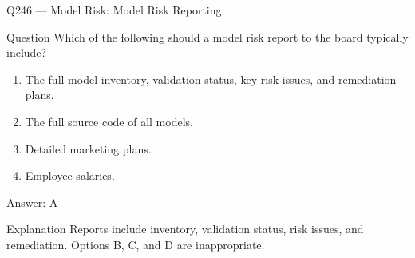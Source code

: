 \documentclass[aspectratio=169,8pt]{beamer}
\begin{document}
																																\begin{frame}{Q246 --- Model Risk: Model Risk Reporting}
																																	\begin{block}{Question}
																																		Which of the following should a model risk report to the board typically include?
																																		\begin{enumerate}
																																			\item The full model inventory, validation status, key risk issues, and remediation plans.
																																			\item The full source code of all models.
																																			\item Detailed marketing plans.
																																			\item Employee salaries.
																																		\end{enumerate}  \end{block}
																																		\begin{exampleblock}{Answer: A}\end{exampleblock}
																																		\begin{block}{Explanation}
																																			Reports include inventory, validation status, risk issues, and remediation. Options B, C, and D are inappropriate.
																																		\end{block}
																																	\end{frame}
																																	
\end{document}
